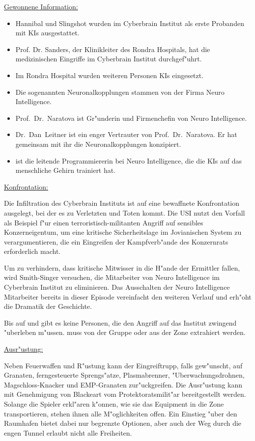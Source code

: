 \begin{remarks}
	\underline{Gewonnene Information:}
	
	\begin{itemize}
		\item Hannibal und Slingshot wurden im Cyberbrain Institut als erste Probanden mit KIs ausgestattet.
		\item Prof. Dr. Sanders, der Klinikleiter des Rondra Hospitals, hat die medizinischen Eingriffe im Cyberbrain Institut 
			durchgef"uhrt.
		\item Im Rondra Hospital wurden weiteren Personen KIs eingesetzt.
		\item Die sogenannten Neuronalkopplungen stammen von der Firma Neuro Intelligence.
		\item Prof.~Dr.~Naratova ist Gr"underin und Firmenchefin von Neuro Intelligence.
		\item Dr.~Dan~Leitner ist ein enger Vertrauter von Prof.~Dr.~Naratova. Er hat gemeinsam mit ihr die Neuronalkopplungen konzipiert.
		\item \ml{} ist die leitende Programmiererin bei Neuro Intelligence, die die KIs auf das menschliche Gehirn trainiert hat.
	\end{itemize}	 

	\underline{Konfrontation:}

	Die Infiltration des Cyberbrain Instituts ist auf eine bewaffnete Konfrontation ausgelegt, bei der es zu Verletzten und Toten kommt. Die USI nutzt den Vorfall als Beispiel f"ur einen terroristisch-militanten Angriff auf sensibles Konzerneigentum, um eine kritische Sicherheitslage im Jovianischen System zu verargumentieren, die ein Eingreifen der Kampfverb"ande des Konzernrats erforderlich macht.

	Um zu verhindern, dass kritische Mitwisser in die H"ande der Ermittler fallen, wird Smith-Singer versuchen, die Mitarbeiter von Neuro Intelligence im Cyberbrain Institut zu eliminieren. Das Ausschalten der Neuro Intelligence Mitarbeiter bereits in dieser Episode vereinfacht den weiteren Verlauf und erh"oht die Dramatik der Geschichte.
	
	Bis auf \ml{} und \xl{} gibt es keine Personen, die den Angriff auf das Institut zwingend "uberleben m"ussen. \ml{} muss von der Gruppe oder \xl{} aus der Zone extrahiert werden.

	\underline{Ausr"ustung:}

	Neben Feuerwaffen und R"ustung kann der Eingreiftrupp, falls gew"unscht, auf Granaten, ferngesteuerte Sprengs"atze, Plasmabrenner, "Uberwachungsdrohnen, Magschloss-Knacker und EMP-Granaten zur"uckgreifen. Die Ausr"ustung kann mit Genehmigung von Blackeart vom Protektoratsmilit"ar bereitgestellt werden. Solange die Spieler erkl"aren k"onnen, wie sie das Equipment in die Zone transportieren, stehen ihnen alle M"oglichkeiten offen. Ein Einstieg "uber den Raumhafen bietet dabei nur begrenzte Optionen, aber auch der Weg durch die engen Tunnel erlaubt nicht alle Freiheiten.
\end{remarks}
